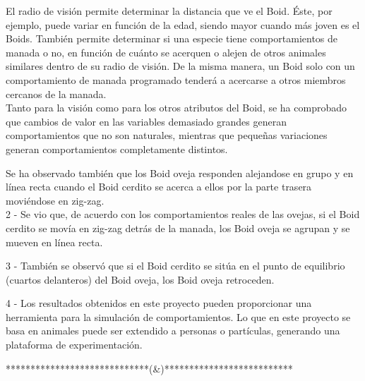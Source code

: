 El radio de visión permite determinar la distancia que ve el Boid. Éste, por ejemplo, puede variar en función de la edad, siendo mayor cuando
más joven es el Boids. También permite determinar si una especie tiene comportamientos de manada o no, en función de cuánto se acerquen o 
alejen de otros animales similares dentro de su radio de visión. De la misma manera, un Boid solo con un comportamiento de manada programado 
tenderá a acercarse a otros miembros cercanos de la manada.\\

Tanto para la visión como para los otros atributos del Boid, se ha comprobado que cambios de valor en las variables demasiado grandes generan comportamientos 
que no son naturales, mientras que pequeñas variaciones generan comportamientos completamente distintos. 


Se ha observado también que los Boid oveja responden alejandose en grupo y en línea recta cuando el Boid cerdito se acerca a ellos por la parte trasera 
moviéndose en zig-zag.\\


2 - Se vio que, de acuerdo con los comportamientos reales de las ovejas, si el Boid cerdito se movía en zig-zag detrás de la manada, los Boid 
oveja se agrupan y se mueven en línea recta.

3 - También se observó que si el Boid cerdito se sitúa en el punto de equilibrio (cuartos delanteros) del Boid oveja, los Boid oveja retroceden.

4 - Los resultados obtenidos en este proyecto pueden proporcionar una herramienta para la simulación de comportamientos. Lo que en este
proyecto se basa en animales puede ser extendido a personas o partículas, generando una plataforma de experimentación.


*****************************(&)**************************
